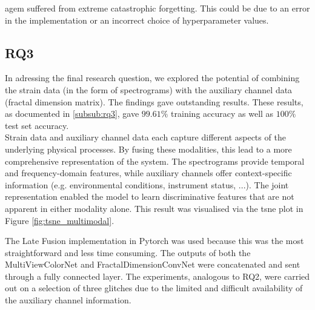 \acrshort{agem} suffered from extreme catastrophic forgetting. This could be due to an error in the implementation or an incorrect choice of hyperparameter values. \\

\subsection{RQ3}
In adressing the final research question, we explored the potential of combining the strain data (in the form of spectrograms) with the auxiliary channel data (fractal dimension matrix). The findings gave outstanding results. These results, as documented in \ref{subsub:rq3}, gave $99.61\%$ training accuracy as well as $100\%$ test set accuracy. \\
Strain data and auxiliary channel data each capture different aspects of the underlying physical processes. By fusing these modalities, this lead to a more comprehensive representation of the system. The spectrograms provide temporal and frequency-domain features, while auxiliary channels offer context-specific information (e.g. environmental conditions, instrument status, ...).
The joint representation enabled the model to learn discriminative features that are not apparent in either modality alone. This result was visualised via the \acrshort{tsne} plot in Figure \ref{fig:tsne_multimodal}.

The Late Fusion implementation in Pytorch was used because this was the most straightforward and less time consuming. The outputs of both the MultiViewColorNet and FractalDimensionConvNet were concatenated and sent through a fully connected layer. The experiments, analogous to RQ2, were carried out on a selection of three glitches due to the limited and difficult availability of the auxiliary channel information. 

\newpage
